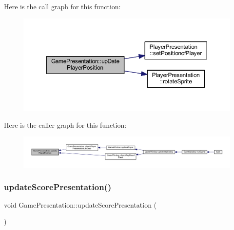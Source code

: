 Here is the call graph for this function\+:\nopagebreak
\begin{figure}[H]
\begin{center}
\leavevmode
\includegraphics[width=350pt]{class_game_presentation_a08abc97c6f65eda4ac7c54d55a9054b4_cgraph}
\end{center}
\end{figure}
Here is the caller graph for this function\+:\nopagebreak
\begin{figure}[H]
\begin{center}
\leavevmode
\includegraphics[width=350pt]{class_game_presentation_a08abc97c6f65eda4ac7c54d55a9054b4_icgraph}
\end{center}
\end{figure}
\mbox{\label{class_game_presentation_ab2cf74842583bf5b63e5973fb8b657be}} 
\subsubsection{\texorpdfstring{update\+Score\+Presentation()}{updateScorePresentation()}}
{\footnotesize\ttfamily void Game\+Presentation\+::update\+Score\+Presentation (\begin{DoxyParamCaption}{ }\end{DoxyParamCaption})}

